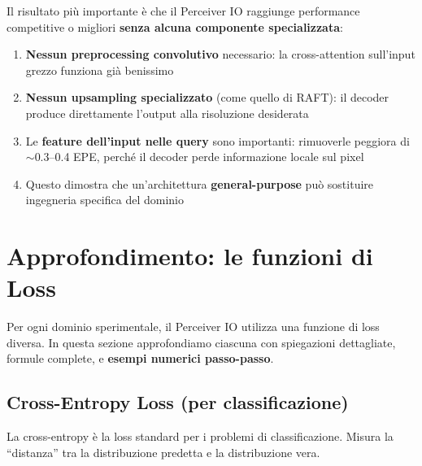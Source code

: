 \documentclass[12pt,a4paper]{article}
\begin{document}
\begin{notabox}
Il risultato pi\`u importante \`e che il Perceiver IO raggiunge performance competitive o migliori \textbf{senza alcuna componente specializzata}:
\begin{enumerate}
    \item \textbf{Nessun preprocessing convolutivo} necessario: la cross-attention sull'input grezzo funziona gi\`a benissimo
    \item \textbf{Nessun upsampling specializzato} (come quello di RAFT): il decoder produce direttamente l'output alla risoluzione desiderata
    \item Le \textbf{feature dell'input nelle query} sono importanti: rimuoverle peggiora di $\sim$0.3--0.4 EPE, perch\'e il decoder perde informazione locale sul pixel
    \item Questo dimostra che un'architettura \textbf{general-purpose} pu\`o sostituire ingegneria specifica del dominio
\end{enumerate}
\end{notabox}


\section{Approfondimento: le funzioni di Loss} \label{sec:cross_entropy_loss}

Per ogni dominio sperimentale, il Perceiver IO utilizza una funzione di loss diversa. In questa sezione approfondiamo ciascuna con spiegazioni dettagliate, formule complete, e \textbf{esempi numerici passo-passo}.

\subsection{Cross-Entropy Loss (per classificazione)}

La cross-entropy \`e la loss standard per i problemi di classificazione. Misura la ``distanza'' tra la distribuzione predetta e la distribuzione vera.
\end{document}
